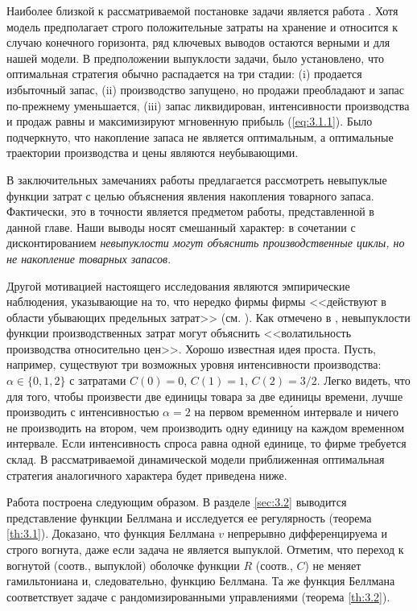 Наиболее близкой к рассматриваемой постановке задачи является работа \cite{ChaJouTah03}. Хотя модель \cite{ChaJouTah03} предполагает строго положительные затраты на хранение и относится к случаю конечного горизонта, ряд ключевых выводов остаются верными и для нашей модели. В предположении выпуклости задачи, было установлено, что оптимальная стратегия обычно распадается на три стадии: (i) продается избыточный запас, (ii) производство запущено, но продажи преобладают и запас по-прежнему уменьшается, (iii) запас ликвидирован, интенсивности производства и продаж равны и максимизируют мгновенную прибыль (\ref{eq:3.1.1}). Было подчеркнуто, что накопление запаса не является оптимальным, а оптимальные траектории производства и цены являются неубывающими.

В заключительных замечаниях работы \cite{ChaJouTah03} предлагается рассмотреть невыпуклые функции затрат с целью объяснения явления накопления товарного запаса. Фактически, это в точности является предметом работы, представленной в данной главе. Наши выводы носят смешанный характер: в сочетании с дисконтированием \emph{невыпуклости могут объяснить производственные циклы, но не накопление товарных запасов}.

Другой мотивацией настоящего исследования являются эмпирические наблюдения, указывающие на то, что нередко фирмы  фирмы <<действуют в области убывающих предельных затрат>> (см. \cite{Ram91}). Как отмечено в \cite{Ram91}, невыпуклости функции производственных затрат могут объяснить <<волатильность производства относительно цен>>. Хорошо известная идея проста. Пусть, например, существуют три возможных уровня интенсивности производства: $\alpha\in\{0,1,2\}$ с затратами $C(0)=0$, $C(1)=1$, $C(2)=3/2$. Легко видеть, что для того, чтобы произвести две единицы товара за две единицы времени, лучше производить с интенсивностью $\alpha=2$ на первом временн\'{о}м интервале и ничего не производить на втором, чем производить одну единицу на каждом временном интервале. Если интенсивность спроса равна одной единице, то фирме требуется склад. В рассматриваемой динамической модели приближенная оптимальная стратегия аналогичного характера будет приведена ниже.

Работа построена следующим образом. В разделе \ref{sec:3.2} выводится представление функции Беллмана и исследуется ее регулярность (теорема \ref{th:3.1}). Доказано, что функция Беллмана $v$ непрерывно дифференцируема и строго вогнута, даже если задача не является выпуклой. Отметим, что переход к вогнутой (соотв., выпуклой) оболочке функции $R$ (соотв., $C$) не меняет гамильтониана и, следовательно, функцию Беллмана. Та же функция Беллмана соответствует задаче с рандомизированными управлениями (теорема \ref{th:3.2}).

